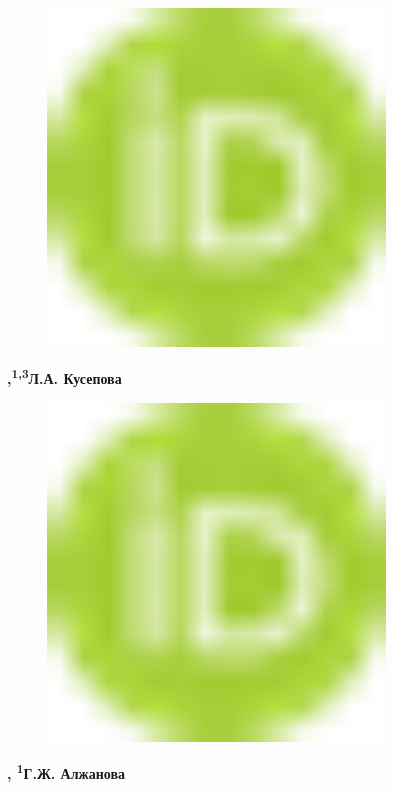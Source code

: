 \begin{figure}[H]
	\centering
	\includegraphics[width=0.8\textwidth]{media/chem2/image1}
	\caption*{}
\end{figure}
{\bfseries ,\textsuperscript{1,3}Л.А.
Кусепова}
\begin{figure}[H]
	\centering
	\includegraphics[width=0.8\textwidth]{media/chem2/image1}
	\caption*{}
\end{figure}
{\bfseries ,
\textsuperscript{1}Г.Ж.
Алжанова}
